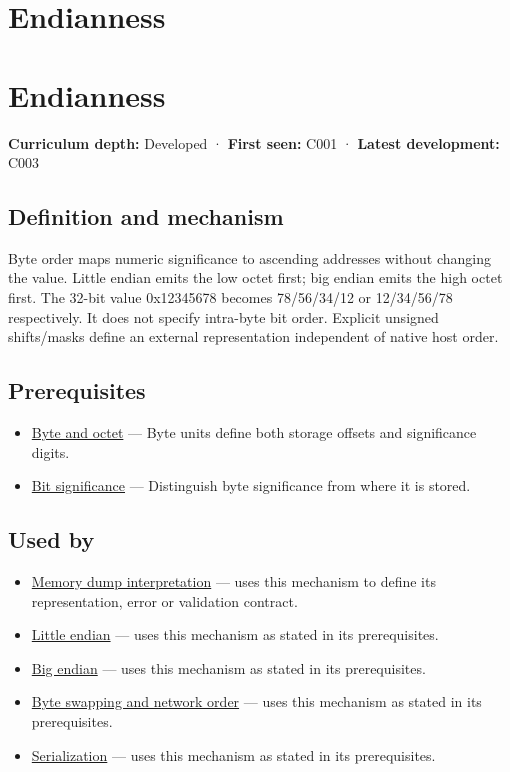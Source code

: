 \hypertarget{appendix-bc07c3d25b18}{}
\section*{Endianness}
\section{Endianness}\label{appendix-bc07c3d25b18-endianness}

\textbf{Curriculum depth:} Developed · \textbf{First seen:} C001 · \textbf{Latest development:} C003

\subsection{Definition and mechanism}\label{appendix-bc07c3d25b18-definition-and-mechanism}

Byte order maps numeric significance to ascending addresses without changing the value. Little endian emits the low octet first; big endian emits the high octet first. The 32-bit value 0x12345678 becomes 78/56/34/12 or 12/34/56/78 respectively. It does not specify intra-byte bit order. Explicit unsigned shifts/masks define an external representation independent of native host order.

\subsection{Prerequisites}\label{appendix-bc07c3d25b18-prerequisites}

\begin{itemize}
\tightlist
\item
  \hyperref[appendix-5bee2df85484]{Byte and octet} --- Byte units define both storage offsets and significance digits.
\item
  \hyperref[appendix-280445746493]{Bit significance} --- Distinguish byte significance from where it is stored.
\end{itemize}

\subsection{Used by}\label{appendix-bc07c3d25b18-used-by}

\begin{itemize}
\item
  \hyperref[appendix-230b59c0676b]{Memory dump interpretation} --- uses this mechanism to define its representation, error or validation contract.
\item
  \hyperref[appendix-367b6abf460e]{Little endian} --- uses this mechanism as stated in its prerequisites.
\item
  \hyperref[appendix-92e040df969a]{Big endian} --- uses this mechanism as stated in its prerequisites.
\item
  \hyperref[appendix-11ba36693aa2]{Byte swapping and network order} --- uses this mechanism as stated in its prerequisites.
\item
  \hyperref[appendix-91d09ebed979]{Serialization} --- uses this mechanism as stated in its prerequisites.
\end{itemize}

